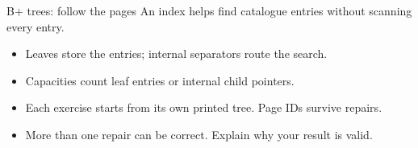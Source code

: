 \documentclass[aspectratio=169]{beamer}
\begin{document}
\begin{frame}{B+ trees: follow the pages}
An index helps find catalogue entries without scanning every entry.
\begin{itemize}\item Leaves store the entries; internal separators route the search.
\item Capacities count leaf entries or internal child pointers.
\item Each exercise starts from its own printed tree. Page IDs survive repairs.
\item More than one repair can be correct. Explain why your result is valid.\end{itemize}
\end{frame}
\begin{frame}
\end{frame}
\begin{frame}
\end{frame}
\begin{frame}
\end{frame}
\begin{frame}
\end{frame}
\begin{frame}
\end{frame}
\begin{frame}
\end{frame}
\end{document}
